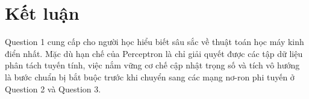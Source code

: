\documentclass[11pt, a4paper]{article}
\begin{document}
\section{Kết luận}
Question 1 cung cấp cho người học hiểu biết sâu sắc về thuật toán học máy kinh điển nhất. Mặc dù hạn chế của Perceptron là chỉ giải quyết được các tập dữ liệu phân tách tuyến tính, việc nắm vững cơ chế cập nhật trọng số và tích vô hướng là bước chuẩn bị bắt buộc trước khi chuyển sang các mạng nơ-ron phi tuyến ở Question 2 và Question 3.
\end{document}
